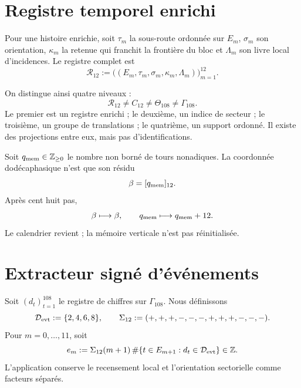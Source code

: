 \section{Registre temporel enrichi}

\begin{definition}
\label{def:u006d-registro-dodecafasico}
Pour une histoire enrichie, soit \(\tau_m\) la sous-route ordonnée sur
\(E_m\), \(\sigma_m\) son orientation, \(\kappa_m\) la retenue qui franchit la
frontière du bloc et \(\Lambda_m\) son livre local d’incidences. Le
registre complet est
\begin{equation}
 \mathcal R_{12}:=
 \bigl(
 (E_m,\tau_m,\sigma_m,\kappa_m,\Lambda_m)
 \bigr)_{m=1}^{12}.
 \label{eq:u006d-registro-r12}
\end{equation}
\end{definition}

On distingue ainsi quatre niveaux :
\begin{equation}
 \boxed{
 \mathcal R_{12}
 \neq C_{12}
 \neq\Theta_{108}
 \neq\Gamma_{108}.}
 \label{eq:u006d-cuatro-objetos}
\end{equation}
Le premier est un registre enrichi ; le deuxième, un indice de secteur ; le
troisième, un groupe de translations ; le quatrième, un support ordonné. Il existe
des projections entre eux, mais pas d’identifications.

Soit \(q_{\rm mem}\in\mathbb Z_{\geq0}\) le nombre non borné de tours
nonadiques. La coordonnée dodécaphasique n’est que son résidu
\[
 \beta=[q_{\rm mem}]_{12}.
\]
Après cent huit pas,
\[
 \beta\longmapsto\beta,
 \qquad
 q_{\rm mem}\longmapsto q_{\rm mem}+12.
\]
Le calendrier revient ; la mémoire verticale n’est pas réinitialisée.

\section{Extracteur signé d’événements}

Soit \((d_t)_{t=1}^{108}\) le registre de chiffres sur
\(\Gamma_{108}\). Nous définissons
\begin{equation}
 \mathcal D_{\rm evt}:=\{2,4,6,8\},
 \qquad
 \Sigma_{12}:=(+,+,+,-,-,-,+,+,+,-,-,-).
 \label{eq:u006d-datos-eventos}
\end{equation}
Pour \(m=0,\ldots,11\), soit
\begin{equation}
 e_m:=
 \Sigma_{12}(m+1)\,
 \#\{t\in E_{m+1}:d_t\in\mathcal D_{\rm evt}\}
 \in\mathbb Z.
 \label{eq:u006d-eventos-firmados}
\end{equation}
L’application conserve le recensement local et l’orientation sectorielle comme
facteurs séparés.

